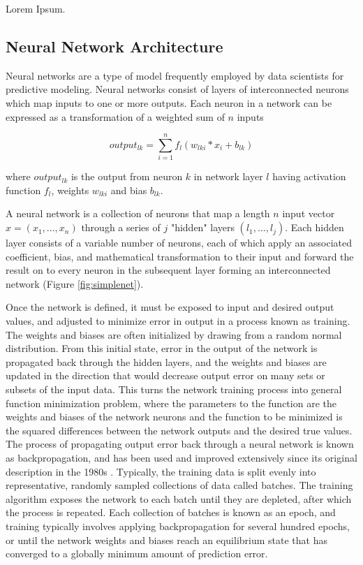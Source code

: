 Lorem Ipsum.

\subsection{Neural Network Architecture} \label{ssec:neuralnets}

Neural networks are a type of model frequently employed by data scientists
for predictive modeling. Neural networks consist of layers of interconnected neurons
which map inputs to one or more outputs. Each neuron in a network can be expressed as a 
transformation of a weighted sum of $n$ inputs 

\begin{equation}
output_{lk} = \sum_{i=1}^{n} f_l(w_{lki} * x_{i} + b_{lk})
\label{eq:neuron}
\end{equation}

where $output_{lk}$ is the output from neuron $k$ in network layer $l$ having activation
function $f_l$, weights $w_{lki}$ and bias $b_{lk}$.

A neural network is a collection of neurons that map a 
length $n$ input vector $x = (x_1, ..., x_n)$ through a series of $j$ 
"hidden" layers $(l_1, ..., l_j)$. Each hidden layer consists of a variable 
number of neurons, each of which apply an associated coefficient, bias, and 
mathematical transformation to their input and forward the 
result on to every neuron in the subsequent layer forming an interconnected 
network (Figure \ref{fig:simplenet}).

\ifdefined\showtablesandfigures
\fi


Once the network is defined, it must be exposed to input and desired output
values, and adjusted to minimize error in output in a process known as training.
The weights and biases are often initialized by drawing from a
random normal distribution. From this initial state, error in 
the output of the network is propagated back through the hidden 
layers, and the weights and biases are updated in the direction that would 
decrease output error on many sets or subsets of the input data. 
This turns the network training process into general 
function minimization problem, where the parameters to the function are the 
weights and biases of the network neurons and the function to be 
minimized is the squared differences between the network outputs and 
the desired true values. The process of propagating output error back 
through a neural network is known as backpropagation, and has been used 
and improved extensively since its original description in the 
1980s \citep{rumelhart1986}.  Typically, the training data is split 
evenly into representative, randomly sampled collections of data 
called batches. The training algorithm exposes the network to each 
batch until they are depleted, after which the process is repeated. Each 
collection of batches is known as an epoch, and training typically 
involves applying backpropagation for several hundred epochs, or until the network
weights and biases reach an equilibrium state that has converged to a 
globally minimum amount of prediction error.

